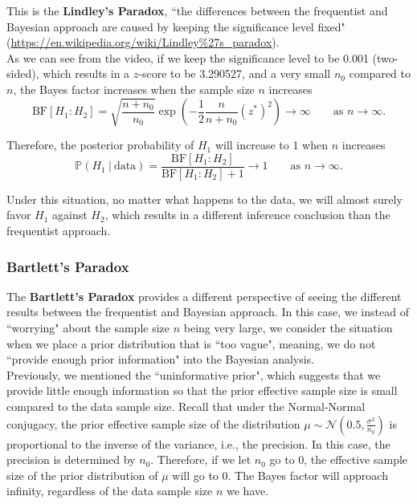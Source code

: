 \documentclass{article}
\def\dsst{\displaystyle}
\begin{document}
This is the \textbf{Lindley's Paradox}, ``the differences between the frequentist and Bayesian approach are caused by keeping the significance level fixed" (\url{https://en.wikipedia.org/wiki/Lindley%27s_paradox}).\\ 
	
As we can see from the video, if we keep the significance level to be 0.001 (two-sided), which results in a $z$-score to be 3.290527, and a very small $n_0$ compared to $n$, the Bayes factor increases when the sample size $n$ increases
$$ \text{BF}[H_1:H_2] = \sqrt{\frac{n+n_0}{n_0}}\exp\left(-\frac{1}{2}\frac{n}{n+n_0}(z^*)^2\right) \rightarrow \infty \qquad \text{as $n\rightarrow \infty$}. $$

Therefore, the posterior probability of $H_1$ will increase to 1 when $n$ increases
$$ \mathbb{P}(H_1~|~\text{data}) = \frac{\text{BF}[H_1:H_2]}{\text{BF}[H_1:H_2]+1} \rightarrow 1 \qquad \text{as $n\rightarrow \infty$}.$$

Under this situation, no matter what happens to the data, we will almost surely favor $H_1$ against $H_2$, which results in a different inference conclusion than the frequentist approach.

\subsubsection*{Bartlett's Paradox}

The \textbf{Bartlett's Paradox} provides a different perspective of seeing the different results between the frequentist and Bayesian approach. In this case, we instead of ``worrying" about the sample size $n$ being very large, we consider the situation when we place a prior distribution that is ``too vague", meaning, we do not ``provide enough prior information" into the Bayesian analysis.\\

Previously, we mentioned the ``uninformative prior", which suggests that we provide little enough information so that the prior effective sample size is small compared to the data sample size. Recall that under the Normal-Normal conjugacy, the prior effective sample size of the distribution $\mu \sim \dsst \mathcal{N}\left(0.5, \frac{\sigma^2}{n_0}\right)$ is proportional to the inverse of the variance, i.e., the precision. In this case, the precision is determined by $n_0$. Therefore, if we let $n_0$ go to 0, the effective sample size of the prior distribution of $\mu$ will go to 0. The Bayes factor will approach infinity, regardless of the data sample size $n$ we have.
\end{document}
